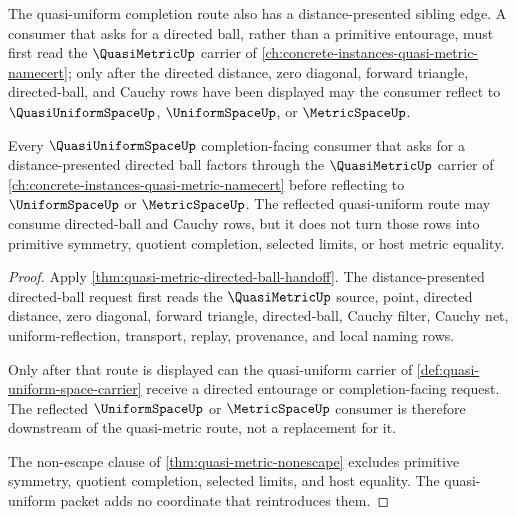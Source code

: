 The quasi-uniform completion route also has a distance-presented sibling edge. A consumer that asks for a directed ball, rather than a primitive entourage, must first read the $\QuasiMetricUp$ carrier of \autoref{ch:concrete-instances-quasi-metric-namecert}; only after the directed distance, zero diagonal, forward triangle, directed-ball, and Cauchy rows have been displayed may the consumer reflect to $\QuasiUniformSpaceUp$, $\UniformSpaceUp$, or $\MetricSpaceUp$.

\begin{theorem}
\label{thm:quasi-uniform-space-quasi-metric-forward-link}
Every $\QuasiUniformSpaceUp$ completion-facing consumer that asks for a distance-presented directed ball factors through the $\QuasiMetricUp$ carrier of \autoref{ch:concrete-instances-quasi-metric-namecert} before reflecting to $\UniformSpaceUp$ or $\MetricSpaceUp$. The reflected quasi-uniform route may consume directed-ball and Cauchy rows, but it does not turn those rows into primitive symmetry, quotient completion, selected limits, or host metric equality.
\end{theorem}
\begin{proof}
Apply \autoref{thm:quasi-metric-directed-ball-handoff}. The distance-presented directed-ball request first reads the $\QuasiMetricUp$ source, point, directed distance, zero diagonal, forward triangle, directed-ball, Cauchy filter, Cauchy net, uniform-reflection, transport, replay, provenance, and local naming rows.

Only after that route is displayed can the quasi-uniform carrier of \autoref{def:quasi-uniform-space-carrier} receive a directed entourage or completion-facing request. The reflected $\UniformSpaceUp$ or $\MetricSpaceUp$ consumer is therefore downstream of the quasi-metric route, not a replacement for it.

The non-escape clause of \autoref{thm:quasi-metric-nonescape} excludes primitive symmetry, quotient completion, selected limits, and host equality. The quasi-uniform packet adds no coordinate that reintroduces them.
\end{proof}
